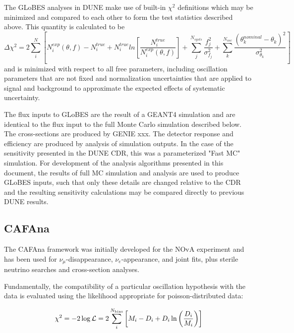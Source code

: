 The GLoBES analyses in DUNE make use of built-in $\chi^2$ definitions which may be minimized and compared to each other to form the test statistics described above. This quantity is calculated to be
\begin{equation}
    \Delta\chi^2 = 2 \sum_i^N [N_i^{exp}(\theta,f) - N_i^{true} + N_i^{true}ln[\frac{N_i^{true}}{N_i^{exp}(\theta,f)}] + \sum_j^{N_{systs}}\frac{f_j^2}{\sigma_{f_j}^2} + \sum_k^{N_{osc}}\frac{(\theta_k^{nominal}-\theta_k)^2}{\sigma_{\theta_k}^2}]
\end{equation}
and is minimized with respect to all free parameters, including oscillation parameters that are not fixed and normalization uncertainties that are applied to signal and background to approximate the expected effects of systematic uncertainty. 

The flux inputs to GLoBES are the result of a GEANT4 simulation and are identical to the flux input to the full Monte Carlo simulation described below. The cross-sections are produced by GENIE xxx. The detector response and efficiency are produced by analysis of simulation outputs. In the case of the sensitivity presented in the DUNE CDR, this was a parameterized "Fast MC" simulation. For development of the analysis algorithms presented in this document, the results of full MC simulation and analysis are used to produce GLoBES inputs, such that only these details are changed relative to the CDR and the resulting sensitivity calculations may be compared directly to previous DUNE results.

\subsection{CAFAna}
\label{sect:methods-cafana}

The CAFAna framework was initially developed for the NOvA experiment and has been used for $\nu_\mu$-disappearance, $\nu_e$-appearance, and joint fits, plus sterile neutrino searches and cross-section analyses.

Fundamentally, the compatibility of a particular oscillation hypothesis with the data is evaluated using the likelihood appropriate for poisson-distributed data: 

\begin{equation}
    \chi^2 = -2\log\mathcal{L} = 2\sum_i^{N_{\rm bins}}\left[ M_i-D_i+D_i\ln\left({D_i\over M_i}\right) \right]
\end{equation}

